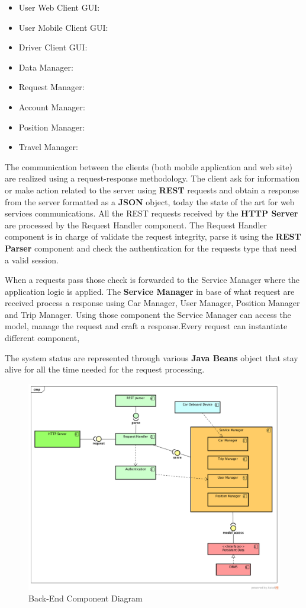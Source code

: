 \begin{itemize}
\item User Web Client GUI:
\item User Mobile Client GUI:
\item Driver Client GUI:
\item Data Manager:
\item Request Manager:
\item Account Manager:
\item Position Manager:
\item Travel Manager:


\end{itemize}
The communication between the clients (both mobile application and web site) are realized using a request-response methodology. The client ask for information or make action related to the server using \textbf{REST} requests and obtain a response from the server formatted as a \textbf{JSON} object, today the state of the art for web services communications.
All the REST requests received by the \textbf{HTTP Server} are processed by the Request Handler component. The Request Handler component is in charge of validate the request integrity, parse it using the \textbf{REST Parser }component and check the authentication for the requests type that need a valid session.


When a requests pass those check is forwarded to the Service Manager where the application logic is applied.
The \textbf{Service Manager} in base of what request are received process a response using Car Manager, User Manager, Position Manager and Trip Manager.
Using those component the Service Manager can access the model, manage the request and craft a response.Every request can instantiate different component,


The system status are represented through various \textbf{Java Beans} object that stay alive for all the time needed for the request processing.

	\begin{figure}[H]	
	\centering
	\includegraphics[width=\textwidth]{img/backend_component_diagram}
	\caption{Back-End Component Diagram}
\end{figure}

